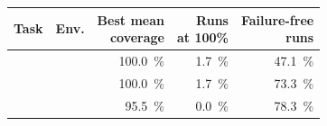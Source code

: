 \begin{tabular}{llrrr}
\toprule
\textbf{Task} & \textbf{Env.}
  & \shortstack{Best mean\\coverage}
  & \shortstack{Runs\\at 100\%}
  & \shortstack{Failure-free \\runs} \\
\midrule
\navthroughposes{}   & \tbworld{}     & \qty{100.0}{\percent} & \qty{1.7}{\percent} & \qty{47.1}{\percent} \\
\navtopose{}         & \tbworld{}     & \qty{100.0}{\percent} & \qty{1.7}{\percent} & \qty{73.3}{\percent} \\
\navtopose{}         & \offices{}     & \qty{95.5}{\percent} & \qty{0.0}{\percent} & \qty{78.3}{\percent} \\
\bottomrule
\end{tabular}
